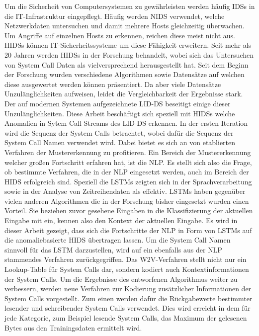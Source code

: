 Um die Sicherheit von Computersystemen zu gewährleisten werden häufig \acp{IDS} in die IT-Infrastruktur eingepflegt.
Häufig werden \ac{NIDS} verwendet, welche Netzwerkdaten untersuchen und damit mehrere Hosts gleichzeitig überwachen.
Um Angriffe auf einzelnen Hosts zu erkennen, reichen diese meist nicht aus.
\acp{HIDS} können IT-Sicherheitssysteme um diese Fähigkeit erweitern.
Seit mehr als 20 Jahren werden \acp{HIDS} in der Forschung behandelt, wobei sich das Untersuchen von System Call Daten als vielversprechend herausgestellt hat.
Seit dem Beginn der Forschung wurden verschiedene Algorithmen sowie Datensätze auf welchen diese ausgewertet werden können präsentiert.
Da aber viele Datensätze Unzulänglichkeiten aufweisen, leidet die Vergleichbarkeit der Ergebnisse stark.
Der auf modernen Systemen aufgezeichnete \ac{LID-DS} beseitigt einige dieser Unzulänglichkeiten.
Diese Arbeit beschäftigt sich speziell mit \acp{HIDS} welche Anomalien in Sytem Call Streams des \ac{LID-DS} erkennen. 
In der  ersten Iteration wird die Sequenz der System Calls betrachtet, wobei dafür die Sequenz der System Call Namen verwendet wird.
Dabei bietet es sich an von etablierten Verfahren der Mustererkennung zu profitieren.
Ein Bereich der Mustererkennung welcher großen Fortschritt erfahren hat, ist die \ac{NLP}.
Es stellt sich also die Frage, ob bestimmte Verfahren, die in der \ac{NLP} eingesetzt werden, auch im Bereich der \ac{HIDS} erfolgreich sind.
Speziell die \acp{LSTM} zeigten sich in der Sprachverarbeitung sowie in der Analyse von Zeitreihendaten als effektiv.
\acp{LSTM} haben gegenüber vielen anderen Algorithmen die in der Forschung bisher eingesetzt wurden einen Vorteil.
Sie beziehen zuvor gesehene Eingaben in die Klassifizierung der aktuellen Eingabe mit ein, kennen also den Kontext der aktuellen Eingabe.
Es wird in dieser Arbeit gezeigt, dass sich die Fortschritte der \ac{NLP} in Form von \acp{LSTM} auf die anomaliebasierte \ac{HIDS} übertragen lassen.
Um die System Call Namen sinnvoll für das \ac{LSTM} darzustellen, wird auf ein ebenfalls aus der \ac{NLP} stammendes Verfahren zurückgegriffen.
Das \ac{W2V}-Verfahren stellt nicht nur ein Lookup-Table für System Calls dar, sondern kodiert auch Kontextinformationen der System Calls.
Um die Ergebnisse des entworfenen Algorithmus weiter zu verbessern, werden neue Verfahren zur Kodierung zusätzlicher Informationen der System Calls vorgestellt.
Zum einen werden dafür die Rückgabewerte bestimmter lesender und schreibender System Calls verwendet. 
Dies wird erreicht in dem für jede Kategorie, zum Beispiel lesende System Calls, das Maximum der gelesenen Bytes aus den Trainingsdaten ermittelt wird.
